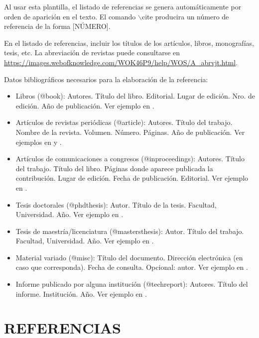 \documentclass{analesafa}
\begin{document}
Al usar esta plantilla, el listado de referencias se genera automáticamente por orden de aparición en el texto. 
El comando \color{Blue} \textsf{$\backslash$cite} \color{Black} producira un número de referencia de la forma [\color{blue}NÚMERO\color{Black}]. 

En el listado de referencias, incluir los títulos de los artículos, libros, monografías, tesis, etc. La abreviación de revistas puede consultarse en \url{https://images.webofknowledge.com/WOK46P9/help/WOS/A_abrvjt.html}. 


Datos bibliográficos necesarios para la elaboración de la referencia:

\begin{itemize}[itemsep=1mm, parsep=0pt]
    \item Libros (@book): Autores. Título del libro. Editorial. Lugar de edición. Nro. de edición. Año de publicación. Ver ejemplo en \cite{libro1}.
    \item Artículos de revistas periódicas (@article): Autores. Título del trabajo. Nombre de la revista. Volumen. Número. Páginas. Año de publicación. Ver ejemplos en \cite{paper1} y \cite{paper2}.
    \item Artículos de comunicaciones a congresos (@inproceedings): Autores. Título del trabajo. Título del libro. Páginas donde aparece publicada la contribución. Lugar de edición. Fecha de publicación. Editorial. Ver ejemplo en \cite{proceeding1}.
    \item Tesis doctorales (@phdthesis): Autor. Título de la tesis. Facultad, Universidad. Año. Ver ejemplo en \cite{tesis1}.
    \item Tesis de maestría/licenciatura (@mastersthesis): Autor. Título del trabajo. Facultad, Universidad. Año. Ver ejemplo en \cite{maestria1}.
    \item Material variado (@misc): Título del documento. Dirección electrónica (en caso que corresponda). Fecha de consulta. Opcional: autor. Ver ejemplo en \cite{motor}.
    \item Informe publicado por alguna institución (@techreport): Autores. Título del informe. Institución. Año. Ver ejemplo en \cite{informe1}.
\end{itemize}



\section*{REFERENCIAS} 
 \printbibliography[heading=none] 

\end{document}
